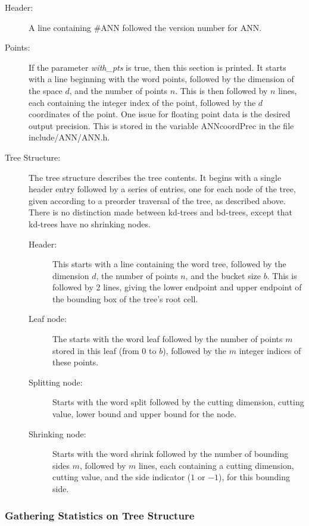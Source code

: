 \documentclass[11pt]{article}		%
\newcommand{\ANN}[0]{\textsf{ANN}}
\begin{document}
\begin{description}
\item[Header:] A line containing \textsf{\#ANN} followed the version number
	for {\ANN}.
\item[Points:] If the parameter \textit{with\_pts} is true, then this section
	is printed.  It starts with a line beginning with the word
	\textsf{points}, followed by the dimension of the space $d$, and the
	number of points $n$.  This is then followed by $n$ lines, each
	containing the integer index of the point, followed by the $d$
	coordinates of the point.  One issue for floating point data is
	the desired output precision.  This is stored in the variable
	\textsf{ANNcoordPrec} in the file \textsf{include/ANN/ANN.h}.
\item[Tree Structure:] The tree structure describes the tree contents.
	It begins with a single header entry followed by a series of
	entries, one for each node of the tree, given according to a
	preorder traversal of the tree, as described above.  There is
	no distinction made between kd-trees and bd-trees, except that
	kd-trees have no shrinking nodes.
	\begin{description}
	\item[Header:] This starts with a line containing the word \textsf{tree},
		followed by the dimension $d$, the number of points $n$, and
		the bucket size $b$.  This is followed by 2 lines, giving
		the lower endpoint and upper endpoint of the bounding box
		of the tree's root cell.
	\item[Leaf node:] The starts with the word \textsf{leaf} followed by
		the number of points $m$ stored in this leaf (from 0 to
		$b$), followed by the $m$ integer indices of these points.
	\item[Splitting node:] Starts with the word \textsf{split} followed by
		the cutting dimension, cutting value, lower bound and
		upper bound for the node.
	\item[Shrinking node:] Starts with the word \textsf{shrink} followed
		by the number of bounding sides $m$, followed by $m$ lines,
		each containing a cutting dimension, cutting value, and
		the side indicator ($1$ or $-1$), for this bounding side.
	\end{description}
\end{description}

\subsubsection{Gathering Statistics on Tree Structure}
\end{document}
